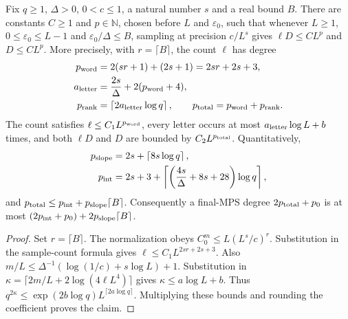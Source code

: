 \begin{lemma}
    \label{thm:lvv_sampled_polynomial_bounds}
    \leanok
    Fix $q\ge1$, $\Delta>0$, $0<c\le1$, a natural number $s$ and a real bound $B$.
    There are constants $C\ge1$ and $p\in\mathbb N$, chosen before $L$
    and $\varepsilon_0$, such that whenever $L\ge1$,
    $0\le\varepsilon_0\le L-1$ and $\varepsilon_0/\Delta\le B$, sampling
    at precision $c/L^s$ gives $\ell D\le CL^p$ and $D\le CL^p$.
    More precisely, with $r=\lceil B\rceil$, the count $\ell$ has degree
    \begin{align*}
        p_{\rm word}   & =2(sr+1)+(2s+1)=2sr+2s+3,                      \\
        a_{\rm letter} & =\frac{2s}{\Delta}+2(p_{\rm word}+4),          \\
        p_{\rm rank}   & =\left\lceil2a_{\rm letter}\log q\right\rceil,
        \qquad p_{\rm total}=p_{\rm word}+p_{\rm rank}.
    \end{align*}
    The count satisfies $\ell\le C_1L^{p_{\rm word}}$, every letter occurs
    at most $a_{\rm letter}\log L+b$ times, and both $\ell D$ and $D$ are
    bounded by $C_2L^{p_{\rm total}}$.
    Quantitatively,
    \begin{align*}
        p_{\rm slope} & =2s+\left\lceil8s\log q\right\rceil, \\
        p_{\rm int}   & =2s+3+
        \left\lceil\left(\frac{4s}{\Delta}+8s+28\right)\log q\right\rceil,
    \end{align*}
    and $p_{\rm total}\le p_{\rm int}+p_{\rm slope}\lceil B\rceil$.
    Consequently a final-MPS degree $2p_{\rm total}+p_0$ is at most
    $(2p_{\rm int}+p_0)+2p_{\rm slope}\lceil B\rceil$.
\end{lemma}
\begin{proof}
    \leanok
    Set $r=\lceil B\rceil$. The normalization obeys
    $C_0^m\le L(L^s/c)^r$. Substitution in the sample-count formula gives
    $\ell\le C_1L^{2sr+2s+3}$. Also
    $m/L\le\Delta^{-1}(\log(1/c)+s\log L)+1$.
    Substitution in $\kappa=\lceil2m/L+2\log(4\ell L^4)\rceil$ gives
    $\kappa\le a\log L+b$. Thus
    $q^{2\kappa}\le\exp(2b\log q)L^{\lceil2a\log q\rceil}$.
    Multiplying these bounds and rounding the coefficient proves the claim.
\end{proof}

